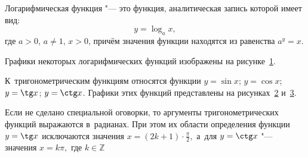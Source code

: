 Логарифмическая функция "--- это функция, аналитическая запись которой
имеет вид:
\begin{equation*}
y = \log_{a} x,
\end{equation*}
где $a > 0$, $a \ne 1$, $x > 0$, причём значения функции находятся из равенства
$\displaystyle a^{y} = x$.

Графики некоторых логарифмических функций изображены на рисунке~\ref{fig_1_2_1-2}.

\begin{figure}\label{fig_1_2_1-2}
\end{figure}

\begin{figure}\label{fig_1_2_3}
\end{figure}

К~тригонометрическим функциям относятся функции 
$y = \sin x$; $y = \cos x$; $y = \tg x$; $y = \ctg x$.
Графики этих функций представлены на рисунках~\ref{fig_1_2_3} и~\ref{fig_1_2_4}.

\begin{figure}\label{fig_1_2_4}
\end{figure}

\begin{Note}
Если не сделано специальной оговорки, то аргументы тригонометрических функций
выражаются в~радианах. При этом их области определения функции $y = \tg x$
исключаются значения $\displaystyle x = (2k +1) \cdot \frac{\pi}{2},$
а~для $y = \ctg x$ "--- значения $x = k\pi,$ где $k \in \mathbb{Z}$
\end{Note}
